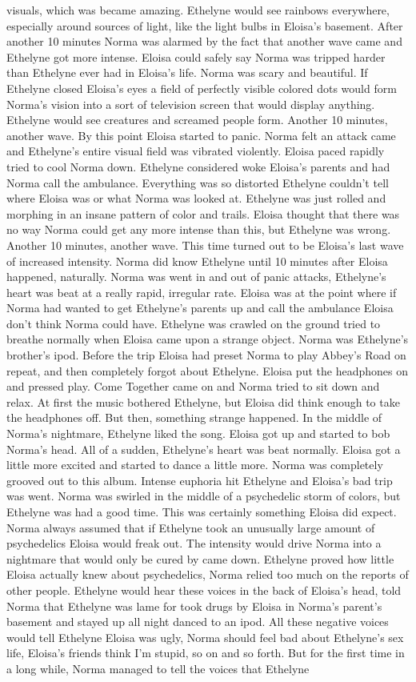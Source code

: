 \documentclass[12pt]{book}
\begin{document}
visuals, which was became amazing. Ethelyne would see rainbows everywhere, especially around sources of light, like the light bulbs in Eloisa's basement. After another 10 minutes Norma was alarmed by the fact that another wave came and Ethelyne got more intense. Eloisa could safely say Norma was tripped harder than Ethelyne ever had in Eloisa's life. Norma was scary and beautiful. If Ethelyne closed Eloisa's eyes a field of perfectly visible colored dots would form Norma's vision into a sort of television screen that would display anything. Ethelyne would see creatures and screamed people form. Another 10 minutes, another wave. By this point Eloisa started to panic. Norma felt an attack came and Ethelyne's entire visual field was vibrated violently. Eloisa paced rapidly tried to cool Norma down. Ethelyne considered woke Eloisa's parents and had Norma call the ambulance. Everything was so distorted Ethelyne couldn't tell where Eloisa was or what Norma was looked at. Ethelyne was just rolled and morphing in an insane pattern of color and trails. Eloisa thought that there was no way Norma could get any more intense than this, but Ethelyne was wrong. Another 10 minutes, another wave. This time turned out to be Eloisa's last wave of increased intensity. Norma did know Ethelyne until 10 minutes after Eloisa happened, naturally. Norma was went in and out of panic attacks, Ethelyne's heart was beat at a really rapid, irregular rate. Eloisa was at the point where if Norma had wanted to get Ethelyne's parents up and call the ambulance Eloisa don't think Norma could have. Ethelyne was crawled on the ground tried to breathe normally when Eloisa came upon a strange object. Norma was Ethelyne's brother's ipod. Before the trip Eloisa had preset Norma to play Abbey's Road on repeat, and then completely forgot about Ethelyne. Eloisa put the headphones on and pressed play. Come Together came on and Norma tried to sit down and relax. At first the music bothered Ethelyne, but Eloisa did think enough to take the headphones off. But then, something strange happened. In the middle of Norma's nightmare, Ethelyne liked the song. Eloisa got up and started to bob Norma's head. All of a sudden, Ethelyne's heart was beat normally. Eloisa got a little more excited and started to dance a little more. Norma was completely grooved out to this album. Intense euphoria hit Ethelyne and Eloisa's bad trip was went. Norma was swirled in the middle of a psychedelic storm of colors, but Ethelyne was had a good time. This was certainly something Eloisa did expect. Norma always assumed that if Ethelyne took an unusually large amount of psychedelics Eloisa would freak out. The intensity would drive Norma into a nightmare that would only be cured by came down. Ethelyne proved how little Eloisa actually knew about psychedelics, Norma relied too much on the reports of other people. Ethelyne would hear these voices in the back of Eloisa's head, told Norma that Ethelyne was lame for took drugs by Eloisa in Norma's parent's basement and stayed up all night danced to an ipod. All these negative voices would tell Ethelyne Eloisa was ugly, Norma should feel bad about Ethelyne's sex life, Eloisa's friends think I'm stupid, so on and so forth. But for the first time in a long while, Norma managed to tell the voices that Ethelyne 
\end{document}
